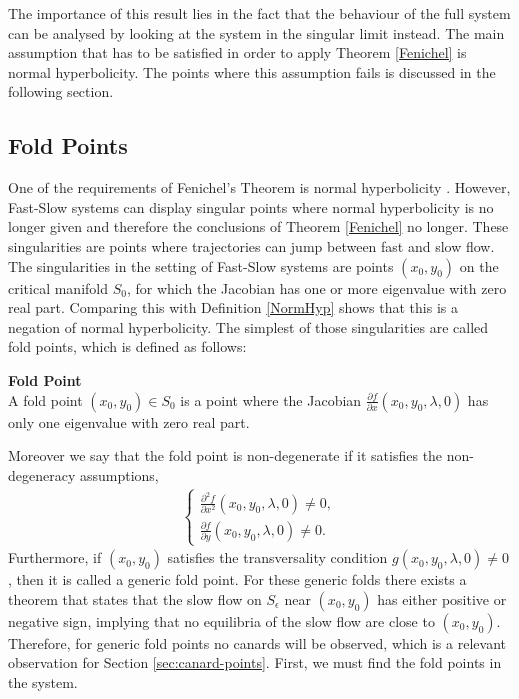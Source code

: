 The importance of this result lies in the fact that the behaviour of the full system can be analysed by looking at the system in the singular limit instead. The main assumption that has to be satisfied in order to apply Theorem \ref{Fenichel} is normal hyperbolicity. The points where this assumption fails is discussed in the following section.


\subsection{Fold Points}\label{sec:singularitiesandfoldpoints}
One of the requirements of Fenichel's Theorem is normal hyperbolicity \citep{Kuehn}. However, Fast-Slow systems can display singular points where normal hyperbolicity is no longer given and therefore the conclusions of Theorem \ref{Fenichel} no longer. These singularities are points where trajectories can jump between fast and slow flow. The singularities in the setting of Fast-Slow systems are points $(x_0,y_0)$ on the critical manifold $S_0$, for which the Jacobian has one or more eigenvalue with zero real part. Comparing this with Definition \ref{NormHyp} shows that this is a negation of normal hyperbolicity. The simplest of those singularities are called fold points, which is defined as follows:
\begin{definition}{\textbf{Fold Point}} \label{FoldDef} \\
	A fold point $(x_0,y_0) \in S_0$ is a point where the Jacobian $ \frac{\partial f}{\partial x}(x_0,y_0, \lambda, 0)$ has only one eigenvalue with zero real part.
\end{definition}
Moreover we say that the fold point is non-degenerate if it satisfies the non-degeneracy assumptions,
\begin{align} \label{NonDeg}
\begin{cases}
\frac{ \partial ^2 f}{ \partial x^2} (x_0,y_0, \lambda, 0) \neq 0, \\
\frac{\partial f}{\partial y}(x_0,y_0, \lambda, 0) \neq 0.
\end{cases}
\end{align}
Furthermore, if $(x_0,y_0)$ satisfies the transversality condition $g(x_0,y_0, \lambda, 0) \neq 0$, then it is called a generic fold point.
For these generic folds there exists a theorem that states that the slow flow on $S_\epsilon$ near $(x_0,y_0)$ has either positive or negative sign, implying that no equilibria of the slow flow are close to $(x_0,y_0)$. Therefore, for generic fold points no canards will be observed, which is a relevant observation for Section \ref{sec:canard-points}. First, we must find the fold points in the system.\\
